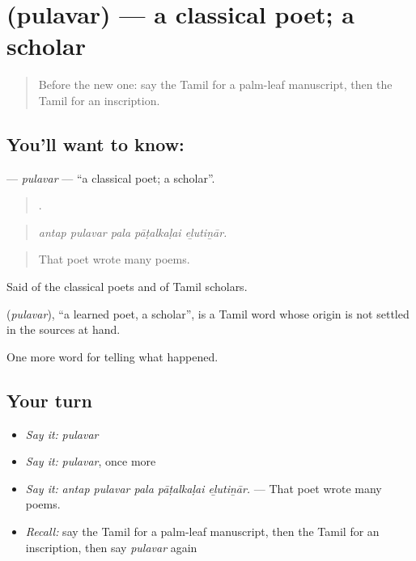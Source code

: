 \section[\texorpdfstring{\ta{புலவர்} (pulavar)}{புலவர் (pulavar)}]{ (pulavar) — a classical poet; a scholar}

\label{lesson:TA-C325-pulavar}



\begin{quote}
Before the new one: say the Tamil for a palm-leaf manuscript, then the Tamil for an inscription.
\end{quote}

\subsection*{You'll want to know: }
\textbf{} — \emph{pulavar} — \textquotedblleft{}a classical poet; a scholar\textquotedblright{}.

\begin{quote}
    .
\end{quote}

\begin{quote}
\emph{antap pulavar pala pāṭalkaḷai eḻutiṉār.}
\end{quote}

\begin{quote}
That poet wrote many poems.
\end{quote}

Said of the classical poets and of Tamil scholars.

\begin{cousinweb}
\textbf{} (\emph{pulavar}), \textquotedblleft{}a learned poet, a scholar\textquotedblright{}, is a Tamil word whose origin is not settled in the sources at hand.
\end{cousinweb}

\begin{grammarlens}[title={What you've built}]
One more word for telling what happened.
\end{grammarlens}

\subsection*{Your turn}
\begin{itemize}
\raggedright
  \item \emph{Say it:} \emph{pulavar}
  \item \emph{Say it:} \emph{pulavar}, once more
  \item \emph{Say it:} \emph{antap pulavar pala pāṭalkaḷai eḻutiṉār.} — That poet wrote many poems.
  \item \emph{Recall:} say the Tamil for a palm-leaf manuscript, then the Tamil for an inscription, then say \emph{pulavar} again
\end{itemize}

